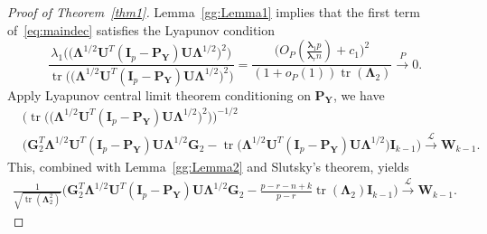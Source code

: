 \documentclass[12pt]{article} %
\DeclareMathOperator{\mytr}{tr}
\newcommand{\bP}{\mathbf{P}}
\newcommand{\bY}{\mathbf{Y}}
\newcommand{\bG}{\mathbf{G}}
\newcommand{\bI}{\mathbf{I}}
\newcommand{\bU}{\mathbf{U}}
\newcommand{\bW}{\mathbf{W}}
\newcommand{\bfsym}[1]{\ensuremath{\boldsymbol{#1}}}
\def\blambda {\bfsym {\lambda}}
\def\bLambda {\bfsym {\Lambda}}
\theoremstyle{definition}
\begin{document}
\begin{appendices}
\begin{proof}[\textrm{Proof of Theorem~\ref{thm1}}]
    Lemma~\eqref{gg:Lemma1} implies that the first term of~\eqref{eq:maindec} satisfies the Lyapunov condition
$$
    \frac{\lambda_1\Big(\big(\bLambda^{1/2} \bU^T (\bI_p-\bP_{\bY})\bU \bLambda^{1/2}\big)^2\Big)}{\mytr \Big( \big(\bLambda^{1/2} \bU^T (\bI_p-\bP_{\bY})\bU \bLambda^{1/2}\big)^2\Big)}
=
\frac{
\big( O_P(\frac{\blambda_1 p}{\blambda_r n})+c_1\big)^2
}{
    (1+o_P(1))\mytr(\bLambda_2)
}
\xrightarrow{P} 0.
$$
Apply Lyapunov central limit theorem conditioning on $\bP_{\bY}$, we have
$$
\begin{aligned}
    &\Big(\mytr \Big(\big(\bLambda^{1/2} \bU^T (\bI_p-\bP_{\bY})\bU \bLambda^{1/2}\big)^2\Big) \Big)^{-1/2}\\
    &\big( \bG_2^T \bLambda^{1/2}\bU^T (\bI_p-\bP_{\bY})\bU\bLambda^{1/2}\bG_2
    -\mytr\big(\bLambda^{1/2} \bU^T (\bI_p-\bP_{\bY})\bU \bLambda^{1/2}\big)
     \bI_{k-1} \big)
\xrightarrow{\mathcal{L}} \bW_{k-1}.
\end{aligned}
$$
    This, combined with Lemma~\ref{gg:Lemma2} and Slutsky's theorem, yields
$$
\begin{aligned}
    \frac{1}{\sqrt{\mytr(\bLambda_2^2)}}
    \big( \bG_2^T \bLambda^{1/2} \bU^T (\bI_p-\bP_{\bY})\bU\bLambda^{1/2}\bG_2
    -\tfrac{p-r-n+k}{p-r}\mytr(\bLambda_2)\bI_{k-1} \big)
\xrightarrow{\mathcal{L}} \bW_{k-1}.
\end{aligned}
$$


\end{proof}
\end{appendices}
\end{document}

